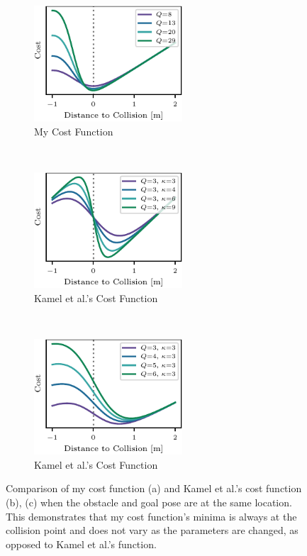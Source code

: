 \begin{figure}[h]
    \centering

    \begin{subfigure}[t]{0.33\textwidth}
        \centering
        \caption{My Cost Function}
        \includegraphics[height=1.7in]{figures/nmpc_cost_function_0.pdf}
    \end{subfigure}%
    ~
    \begin{subfigure}[t]{0.33\textwidth}
        \centering
        \caption{Kamel et al.'s Cost Function}
        \includegraphics[height=1.7in]{figures/nmpc_cost_function_1.pdf}
    \end{subfigure}%
    ~
    \begin{subfigure}[t]{0.33\textwidth}
        \centering
        \caption{Kamel et al.'s Cost Function}
        \includegraphics[height=1.7in]{figures/nmpc_cost_function_2.pdf}
    \end{subfigure}%

    \caption{Comparison of my cost function (a) and Kamel et al.'s cost function (b), (c) when the obstacle and goal pose are at the same location. This demonstrates that my cost function's minima is always at the collision point and does not vary as the parameters are changed, as opposed to Kamel et al.'s function.}
    \label{fig:nmpc_cost_function}
\end{figure}

